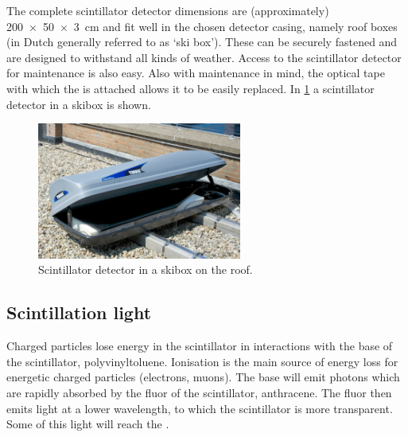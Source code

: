 The complete scintillator detector dimensions are (approximately) \SI[product-units=power]{200 x 50 x 3}{\centi\meter} and fit well in the chosen detector casing, namely roof boxes (in Dutch generally referred to as `ski box'). These can be securely fastened and are designed to withstand all kinds of weather. Access to the scintillator detector for maintenance is also easy. Also with maintenance in mind, the optical tape with which the \pmt is attached allows it to be easily replaced. In \cref{fig:detector_in_skibox} a scintillator detector in a skibox is shown.

\begin{figure}
    \centering
    \includegraphics[width=0.6\textwidth]
                    {plots/station/ADL_105036.jpg}
    \caption{Scintillator detector in a skibox on the roof.}
    \label{fig:detector_in_skibox}
\end{figure}


\subsection{Scintillation light}

Charged particles lose energy in the scintillator in interactions with the base of the scintillator, polyvinyltoluene. Ionisation is the main source of energy loss for energetic charged particles (electrons, muons). The base will emit photons which are rapidly absorbed by the fluor of the scintillator, anthracene. The fluor then emits light at a lower wavelength, to which the scintillator is more transparent. Some of this light will reach the \pmt.

